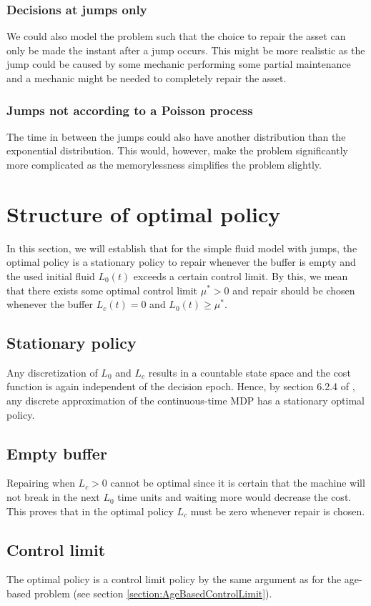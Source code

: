 \documentclass[a4paper]{thesis}
\theoremstyle{definition}
\begin{document}
\subsubsection{Decisions at jumps only}
We could also model the problem such that the choice to repair the asset can only be made the instant after a jump occurs.
This might be more realistic as the jump could be caused by some mechanic performing some partial maintenance and a mechanic might be needed to completely repair the asset.

\subsubsection{Jumps not according to a Poisson process}
The time in between the jumps could also have another distribution than the exponential distribution.
This would, however, make the problem significantly more complicated as the memorylessness simplifies the problem slightly. \section{Structure of optimal policy}
In this section, we will establish that for the simple fluid model with jumps, the optimal policy is a stationary policy to repair whenever the buffer is empty and the used initial fluid $L_0(t)$ exceeds a certain control limit.
By this, we mean that there exists some optimal control limit $\mu^*>0$ and repair should be chosen whenever the buffer $L_c(t)=0$ and $L_0(t)\geq\mu^*$.

\subsection{Stationary policy}
Any discretization of $L_0$ and $L_c$ results in a countable state space and the cost function is again independent of the decision epoch.
Hence, by section 6.2.4 of \cite{Puterman2008}, any discrete approximation of the continuous-time MDP has a stationary optimal policy.

\subsection{Empty buffer}
Repairing when $L_c>0$ cannot be optimal since it is certain that the machine will not break in the next $L_0$ time units and waiting more would decrease the cost.
This proves that in the optimal policy $L_c$ must be zero whenever repair is chosen.

\subsection{Control limit}
The optimal policy is a control limit policy by the same argument as for the age-based problem (see section \ref{section:AgeBasedControlLimit}). 
\end{document}
